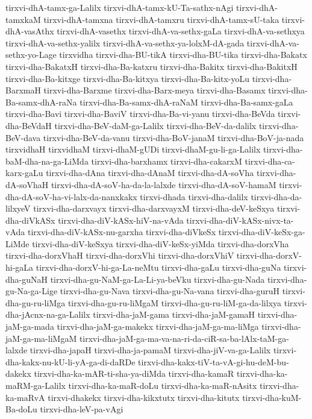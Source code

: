 {tirxvi-dhA-tamx-ga-Lalilx
tirxvi-dhA-tamx-kU-Ta-sathx-nAgi
tirxvi-dhA-tamxkaM
tirxvi-dhA-tamxna
tirxvi-dhA-tamxru
tirxvi-dhA-tamx-sU-taka
tirxvi-dhA-vasAthx
tirxvi-dhA-vasethx
tirxvi-dhA-va-sethx-gaLa
tirxvi-dhA-va-sethxya
tirxvi-dhA-va-sethx-yalilx
tirxvi-dhA-va-sethx-ya-lolxM-dA-gada
tirxvi-dhA-va-sethx-yo-Lage
tirxvidha
tirxvi-dha-BU-tikA
tirxvi-dha-BU-tika
tirxvi-dha-Bakatx
tirxvi-dha-BakatxH
tirxvi-dha-Ba-katxru
tirxvi-dha-Bakitx
tirxvi-dha-BakitxH
tirxvi-dha-Ba-kitxge
tirxvi-dha-Ba-kitxya
tirxvi-dha-Ba-kitx-yoLu
tirxvi-dha-BarxmaH
tirxvi-dha-Barxme
tirxvi-dha-Barx-meya
tirxvi-dha-Basamx
tirxvi-dha-Ba-samx-dhA-raNa
tirxvi-dha-Ba-samx-dhA-raNaM
tirxvi-dha-Ba-samx-gaLa
tirxvi-dha-Bavi
tirxvi-dha-BaviV
tirxvi-dha-Ba-vi-yanu
tirxvi-dha-BeVda
tirxvi-dha-BeVdaH
tirxvi-dha-BeV-daM-ga-Lalilx
tirxvi-dha-BeV-da-dalilx
tirxvi-dha-BeV-dava
tirxvi-dha-BeV-da-vanu
tirxvi-dha-BoV-janaM
tirxvi-dha-BoV-ja-nada
tirxvidhaH
tirxvidhaM
tirxvi-dhaM-gUDi
tirxvi-dhaM-gu-li-ga-Lalilx
tirxvi-dha-baM-dha-na-ga-LiMda
tirxvi-dha-barxhamx
tirxvi-dha-cakarxM
tirxvi-dha-ca-karx-gaLu
tirxvi-dha-dAna
tirxvi-dha-dAnaM
tirxvi-dha-dA-soVha
tirxvi-dha-dA-soVhaH
tirxvi-dha-dA-soV-ha-da-la-lalxde
tirxvi-dha-dA-soV-hamaM
tirxvi-dha-dA-soV-ha-vi-lalx-da-nanxkakx
tirxvi-dhada
tirxvi-dha-dalilx
tirxvi-dha-da-lilxyeV
tirxvi-dha-darxvayx
tirxvi-dha-darxvayxM
tirxvi-dha-deV-keSxya
tirxvi-dha-diVkASx
tirxvi-dha-diV-kASx-hiV-na-vAda
tirxvi-dha-diV-kASx-nivx-ta-vAda
tirxvi-dha-diV-kASx-nu-garxha
tirxvi-dha-diVkeSx
tirxvi-dha-diV-keSx-ga-LiMde
tirxvi-dha-diV-keSxya
tirxvi-dha-diV-keSx-yiMda
tirxvi-dha-dorxVha
tirxvi-dha-dorxVhaH
tirxvi-dha-dorxVhi
tirxvi-dha-dorxVhiV
tirxvi-dha-dorxV-hi-gaLa
tirxvi-dha-dorxV-hi-ga-La-neMtu
tirxvi-dha-gaLu
tirxvi-dha-guNa
tirxvi-dha-guNaH
tirxvi-dha-gu-NaM-ga-La-Li-ya-beVku
tirxvi-dha-gu-Nada
tirxvi-dha-gu-Na-ga-Lige
tirxvi-dha-gu-Nava
tirxvi-dha-gu-Na-vana
tirxvi-dha-guruH
tirxvi-dha-gu-ru-liMga
tirxvi-dha-gu-ru-liMgaM
tirxvi-dha-gu-ru-liM-ga-da-lilxya
tirxvi-dha-jAcnx-na-ga-Lalilx
tirxvi-dha-jaM-gama
tirxvi-dha-jaM-gamaH
tirxvi-dha-jaM-ga-mada
tirxvi-dha-jaM-ga-makekx
tirxvi-dha-jaM-ga-ma-liMga
tirxvi-dha-jaM-ga-ma-liMgaM
tirxvi-dha-jaM-ga-ma-va-na-ri-da-ciR-sa-ba-lAlx-taM-ga-lalxde
tirxvi-dha-japaH
tirxvi-dha-ja-pamaM
tirxvi-dha-jiV-va-ga-Lalilx
tirxvi-dha-kakx-nu-kU-li-yA-ga-di-daRDe
tirxvi-dha-kakx-tiV-ta-vA-gi-hu-deM-bu-dakekx
tirxvi-dha-ka-mAR-ti-sha-ya-diMda
tirxvi-dha-kamaR
tirxvi-dha-ka-maRM-ga-Lalilx
tirxvi-dha-ka-maR-doLu
tirxvi-dha-ka-maR-nAsitx
tirxvi-dha-ka-maRvA
tirxvi-dhakekx
tirxvi-dha-kikxtutx
tirxvi-dha-kitutx
tirxvi-dha-kuM-Ba-doLu
tirxvi-dha-leV-pa-vAgi
}
